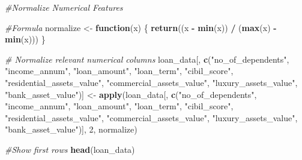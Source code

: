 \documentclass[
]{article}
\newenvironment{Shaded}{\begin{snugshade}}{\end{snugshade}}
\newcommand{\CommentTok}[1]{\textcolor[rgb]{0.56,0.35,0.01}{\textit{#1}}}
\newcommand{\ControlFlowTok}[1]{\textcolor[rgb]{0.13,0.29,0.53}{\textbf{#1}}}
\newcommand{\DecValTok}[1]{\textcolor[rgb]{0.00,0.00,0.81}{#1}}
\newcommand{\FunctionTok}[1]{\textcolor[rgb]{0.13,0.29,0.53}{\textbf{#1}}}
\newcommand{\NormalTok}[1]{#1}
\newcommand{\OtherTok}[1]{\textcolor[rgb]{0.56,0.35,0.01}{#1}}
\newcommand{\SpecialCharTok}[1]{\textcolor[rgb]{0.81,0.36,0.00}{\textbf{#1}}}
\newcommand{\StringTok}[1]{\textcolor[rgb]{0.31,0.60,0.02}{#1}}
\begin{document}
\begin{Shaded}
\begin{Highlighting}[]
\CommentTok{\#Normalize Numerical Features}

\CommentTok{\#Formula}
\NormalTok{normalize }\OtherTok{\textless{}{-}} \ControlFlowTok{function}\NormalTok{(x) \{}
  \FunctionTok{return}\NormalTok{((x }\SpecialCharTok{{-}} \FunctionTok{min}\NormalTok{(x)) }\SpecialCharTok{/}\NormalTok{ (}\FunctionTok{max}\NormalTok{(x) }\SpecialCharTok{{-}} \FunctionTok{min}\NormalTok{(x)))}
\NormalTok{\}}

\CommentTok{\# Normalize relevant numerical columns}
\NormalTok{loan\_data[, }\FunctionTok{c}\NormalTok{(}\StringTok{"no\_of\_dependents"}\NormalTok{, }\StringTok{"income\_annum"}\NormalTok{, }\StringTok{"loan\_amount"}\NormalTok{, }\StringTok{"loan\_term"}\NormalTok{, }
              \StringTok{"cibil\_score"}\NormalTok{, }\StringTok{"residential\_assets\_value"}\NormalTok{, }\StringTok{"commercial\_assets\_value"}\NormalTok{, }\StringTok{"luxury\_assets\_value"}\NormalTok{, }\StringTok{"bank\_asset\_value"}\NormalTok{)] }\OtherTok{\textless{}{-}} 
  \FunctionTok{apply}\NormalTok{(loan\_data[, }\FunctionTok{c}\NormalTok{(}\StringTok{"no\_of\_dependents"}\NormalTok{, }\StringTok{"income\_annum"}\NormalTok{, }\StringTok{"loan\_amount"}\NormalTok{, }\StringTok{"loan\_term"}\NormalTok{, }
                      \StringTok{"cibil\_score"}\NormalTok{, }\StringTok{"residential\_assets\_value"}\NormalTok{, }\StringTok{"commercial\_assets\_value"}\NormalTok{, }\StringTok{"luxury\_assets\_value"}\NormalTok{, }\StringTok{"bank\_asset\_value"}\NormalTok{)], }
        \DecValTok{2}\NormalTok{, normalize)}

\CommentTok{\#Show first rows}
\FunctionTok{head}\NormalTok{(loan\_data)}
\end{Highlighting}
\end{Shaded}
\end{document}
